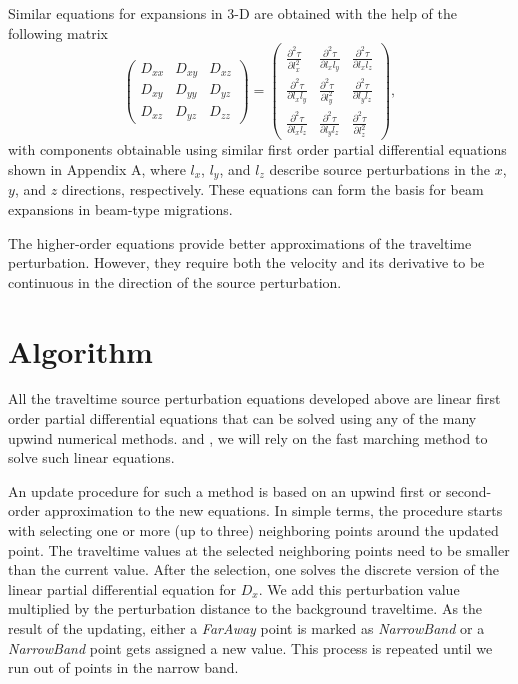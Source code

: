 Similar equations for expansions in 3-D are obtained with the help of the following matrix
\begin{equation}
\left(
\begin{array}{ccc}
D_{xx}  & D_{xy} & D_{xz} \\
D_{xy} & D_{yy} & D_{yz} \\
D_{xz} & D_{yz} & D_{zz}
\end{array}
\right) = 
\left(
\begin{array}{ccc}
\frac{\partial^2 \tau}{\partial l_x^2}
  & \frac{\partial^2 \tau}{\partial l_x l_y} & \frac{\partial^2 \tau}{\partial l_x l_z} \\
\frac{\partial^2 \tau}{\partial l_x l_y} & \frac{\partial^2 \tau}{\partial l_y^2} & \frac{\partial^2 \tau}{\partial l_y l_z} \\
\frac{\partial^2 \tau}{\partial l_x l_z} & \frac{\partial^2 \tau}{\partial l_y l_z} & \frac{\partial^2 \tau}{\partial l_z^2}
\end{array}
\right),
\label{eq:MM}
\end{equation}
with components obtainable using similar first order partial
differential equations shown in Appendix A, where $l_x$, $l_y$, and
$l_z$ describe source perturbations in the $x$, $y$, and $z$
directions, respectively. These equations can form the basis for beam
expansions in beam-type migrations.


The higher-order equations provide better approximations of the
traveltime perturbation.  However, they require both the velocity and
its derivative to be continuous in the direction of the source
perturbation.

\section{Algorithm}

All the traveltime source perturbation equations developed above are
linear first order partial differential equations that can be solved
using any of the many upwind numerical methods. 
 \cite{franklin} and \cite{GPR50-04-03730382}, we will
rely on the fast marching method \cite{paper2} to solve such linear equations.


An update procedure for such a method is based on an upwind first or
second-order approximation to the new equations. In simple terms, the
procedure starts with selecting one or more (up to three) neighboring
points around the updated point. The traveltime values at the selected
neighboring points need to be smaller than the current value. After
the selection, one solves the discrete version of the linear partial
differential equation for $D_x$.  We add this perturbation value
multiplied by the perturbation distance to the background traveltime.
As the result of the updating, either a \emph{FarAway} point is marked
as \emph{NarrowBand} or a \emph{NarrowBand} point gets assigned a new
value. This process is repeated until we run out of points in the
narrow band.

